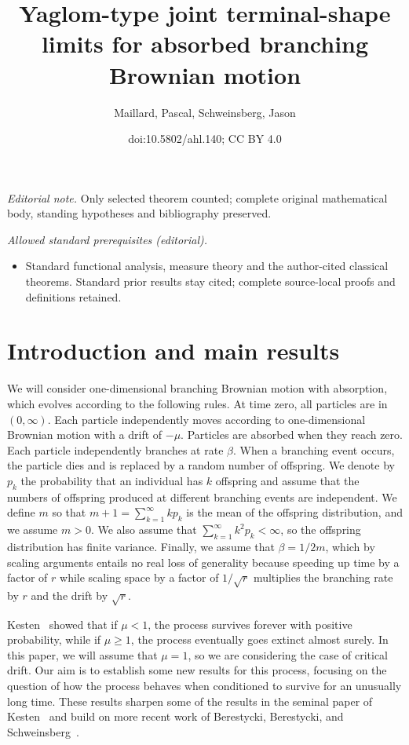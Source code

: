 \documentclass[10pt]{amsart}
\title{Yaglom-type joint terminal-shape limits for absorbed branching Brownian motion}
\author{Maillard, Pascal, Schweinsberg, Jason}
\date{doi:10.5802/ahl.140; CC BY 4.0}
\theoremstyle{definition}\newtheorem{defi}[theo]{Definition}\newtheorem{rema}[theo]{Remark}\newtheorem{exam}[theo]{Example}\newtheorem{exem}[theo]{Example}\newtheorem{nota}[theo]{Notation}
\newcommand{\1} {\mathds{1}}
\begin{document}
\maketitle
\noindent\textit{Editorial note.} Only selected theorem counted; complete original mathematical body, standing hypotheses and bibliography preserved.\par\medskip
\noindent\textit{Allowed standard prerequisites (editorial).}\begin{itemize}
\item Standard functional analysis, measure theory and the author-cited classical theorems. Standard prior results stay cited; complete source-local proofs and definitions retained.
\end{itemize}\medskip

\section{Introduction and main results}

We will consider one-dimensional branching Brownian motion with absorption, which evolves according to the following rules. At time zero, all particles are in $(0, \infty)$. Each particle independently moves according to one-dimensional Brownian motion with a drift of $-\mu$. Particles are absorbed when they reach zero. Each particle independently branches at rate $\beta$. When a branching event occurs, the particle dies and is replaced by a random number of offspring. We denote by $p_k$ the probability that an individual has $k$ offspring and assume that the numbers of offspring produced at different branching events are independent. We define $m$ so that $m + 1 = \sum_{k=1}^{\infty} kp_k$ is the mean of the offspring distribution, and we assume $m > 0$. We also assume that $\sum_{k=1}^{\infty} k^2 p_k < \infty$, so the offspring distribution has finite variance. Finally, we assume that $\beta = 1/2m$, which by scaling arguments entails no real loss of generality because speeding up time by a factor of $r$ while scaling space by a factor of $1/\sqrt{r}$ multiplies the branching rate by $r$ and the drift by $\sqrt{r}$.

Kesten~\cite{kesten} showed that if $\mu < 1$, the process survives forever with positive probability, while if $\mu \geq 1$, the process eventually goes extinct almost surely. In this paper, we will assume that $\mu = 1$, so we are considering the case of critical drift. Our aim is to establish some new results for this process, focusing on the question of how the process behaves when conditioned to survive for an unusually long time. These results sharpen some of the results in the seminal paper of Kesten~\cite{kesten} and build on more recent work of Berestycki, Berestycki, and Schweinsberg~\cite{bbs, bbs3}.
\end{document}
